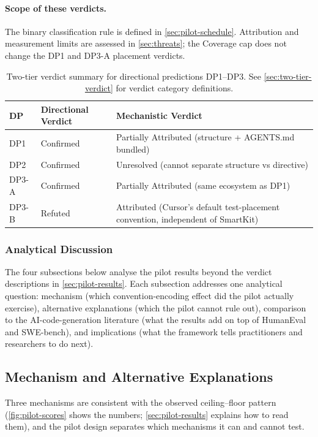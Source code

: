 \documentclass[12pt,a4paper]{report}
\begin{document}
\paragraph{Scope of these verdicts.} The binary classification rule is defined in \autoref{sec:pilot-schedule}. Attribution and measurement limits are assessed in \autoref{sec:threats}; the Coverage cap does not change the DP1 and DP3-A placement verdicts.

\begin{table}[H]
\centering
\caption{Two-tier verdict summary for directional predictions DP1--DP3. See \autoref{sec:two-tier-verdict} for verdict category definitions.}
\label{tab:two-tier-verdicts}
\small
\begin{tabular}{@{}llp{6cm}@{}}
\toprule
\textbf{DP} & \textbf{Directional Verdict} & \textbf{Mechanistic Verdict} \\
\midrule
DP1 & Confirmed & Partially Attributed (structure + AGENTS.md bundled) \\
DP2 & Confirmed & Unresolved (cannot separate structure vs directive) \\
DP3-A & Confirmed & Partially Attributed (same ecosystem as DP1) \\
DP3-B & Refuted & Attributed (Cursor's default test-placement convention, independent of SmartKit) \\
\bottomrule
\end{tabular}
\normalsize
\end{table}

\subsubsection*{Analytical Discussion}
The four subsections below analyse the pilot results beyond the verdict descriptions in \autoref{sec:pilot-results}. Each subsection addresses one analytical question: mechanism (which convention-encoding effect did the pilot actually exercise), alternative explanations (which the pilot cannot rule out), comparison to the AI-code-generation literature (what the results add on top of HumanEval and SWE-bench), and implications (what the framework tells practitioners and researchers to do next).

\subsection{Mechanism and Alternative Explanations}
\label{sec:mechanism-and-alternatives}

Three mechanisms are consistent with the observed ceiling--floor pattern (\autoref{fig:pilot-scores} shows the numbers; \autoref{sec:pilot-results} explains how to read them), and the pilot design separates which mechanisms it can and cannot test.
\end{document}
